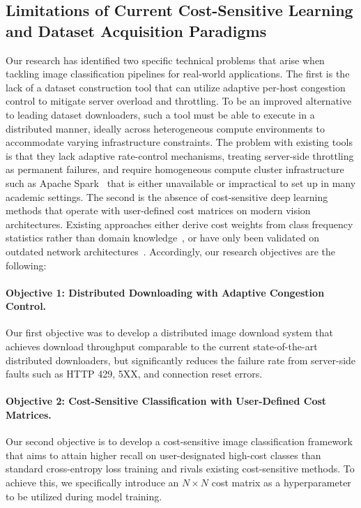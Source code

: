 \documentclass[11pt, letterpaper]{article}
\begin{document}
\subsection{Limitations of Current Cost-Sensitive Learning and Dataset Acquisition Paradigms}
\label{sec:objectives}
Our research has identified two specific technical problems that arise when tackling image classification pipelines for real-world applications. The first is the lack of a dataset construction tool that can utilize adaptive per-host congestion control to mitigate server overload and throttling. To be an improved alternative to leading dataset downloaders, such a tool must be able to execute in a distributed manner, ideally across heterogeneous compute environments to accommodate varying infrastructure constraints. The problem with existing tools is that they lack adaptive rate-control mechanisms, treating server-side throttling as permanent failures, and require homogeneous compute cluster infrastructure such as Apache Spark~\cite{zaharia2016spark, beaumont2022img2dataset} that is either unavailable or impractical to set up in many academic settings. The second is the absence of cost-sensitive deep learning methods that operate with user-defined cost matrices on modern vision architectures. Existing approaches either derive cost weights from class frequency statistics rather than domain knowledge~\cite{menon2021logitadjust, khan2018costsensitive}, or have only been validated on outdated network architectures~\cite{chung2016csdnn}. Accordingly, our research objectives are the following:

\paragraph{\textbf{Objective 1: Distributed Downloading with Adaptive Congestion Control.}} Our first objective was to develop a distributed image download system that achieves download throughput comparable to the current state-of-the-art distributed downloaders, but significantly reduces the failure rate from server-side faults such as HTTP 429, 5XX, and connection reset errors.

\paragraph{\textbf{Objective 2: Cost-Sensitive Classification with User-Defined Cost Matrices.}} Our second objective is to develop a cost-sensitive image classification framework that aims to attain higher recall on user-designated high-cost classes than standard cross-entropy loss training and rivals existing cost-sensitive methods. To achieve this, we specifically introduce an $N \times N$ cost matrix as a hyperparameter to be utilized during model training.
\end{document}
